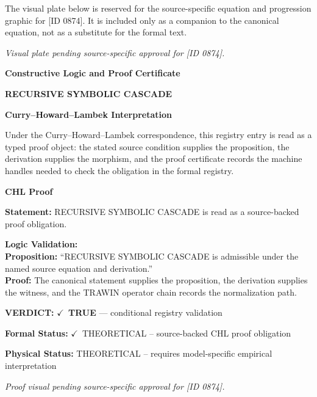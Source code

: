 \begingroup\footnotesize\sloppy
The visual plate below is reserved for the source-specific equation and progression graphic for [ID 0874]. It is included only as a companion to the canonical equation, not as a substitute for the formal text.
\par\endgroup
\begingroup\footnotesize\itshape
Visual plate pending source-specific approval for [ID 0874].
\par\endgroup

\clearpage
\begingroup\tzpsupportsetup
\noindent\textbf{\fontsize{10.8pt}{12.8pt}\selectfont [ID 0874] Constructive Logic and Proof Certificate}\par
\noindent\textbf{\fontsize{10pt}{12pt}\selectfont RECURSIVE SYMBOLIC CASCADE}\par
\vspace{0.45em}
\begingroup
\footnotesize
\setlength{\parskip}{0.22em}
\setlength{\parindent}{0pt}
\noindent\textbf{Curry--Howard--Lambek Interpretation}\par
Under the Curry--Howard--Lambek correspondence, this registry entry is read as a typed proof
object: the stated source condition supplies the proposition, the derivation supplies the
morphism, and the proof certificate records the machine handles needed to check the obligation
in the formal registry.

\vspace{0.45em}
\noindent\textbf{CHL Proof}\par
\textbf{Statement:} RECURSIVE SYMBOLIC CASCADE is read as a source-backed proof obligation.

\textbf{Logic Validation:}\\
\textbf{Proposition:} ``RECURSIVE SYMBOLIC CASCADE is admissible under the named source equation and derivation.''\\
\textbf{Proof:} The canonical statement supplies the proposition, the derivation supplies the witness, and the TRAWIN operator chain records the normalization path.

\textbf{VERDICT:} \ensuremath{\checkmark}\ \textbf{TRUE} --- conditional registry validation

\textbf{Formal Status:} \ensuremath{\checkmark}\ THEORETICAL -- source-backed CHL proof obligation

\textbf{Physical Status:} THEORETICAL -- requires model-specific empirical interpretation
\par\vspace{0.45em}
\par
\vfill
\begingroup\footnotesize\itshape
Proof visual pending source-specific approval for [ID 0874].
\par\endgroup
\vfill
\endgroup
\endgroup

